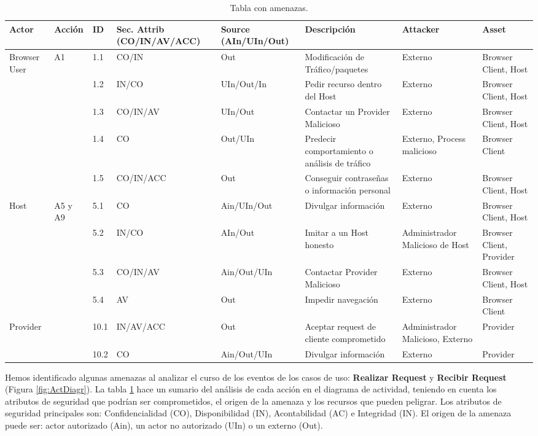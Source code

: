 \begin{landscape}%
\begin{table}[h!t]
\caption{Tabla con amenazas.}
\centering
\begin{tabular}{ |m{3.5em}|m{2.5em}|m{1.5em}|m{6em}|m{6em}|m{10em}|m{6em}|m{7em}|} 
\hline
Actor & Acción & ID & Sec. Attrib (CO/IN/AV/ACC) & Source (AIn/UIn/Out) & Descripción & Attacker & Asset\\
\hline
\multirow{5}{1em}{Browser User} & \multirow{5}{1em}{A1} & 1.1 & CO/IN & Out & Modificación de Tráfico/paquetes & Externo & Browser Client, Host\\ 
& & 1.2 & IN/CO & UIn/Out/In & Pedir recurso dentro del Host & Externo & Browser Client, Host\\
& & 1.3 & CO/IN/AV & UIn/Out & Contactar un Provider Malicioso & Externo & Browser Client, Host\\
& & 1.4 & CO & Out/UIn & Predecir comportamiento o análisis de tráfico & Externo, Process malicioso & Browser Client\\
& & 1.5 & CO/IN/ACC & Out & Conseguir contraseñas o información personal & Externo & Browser Client, Host\\
\hline
\multirow{4}{1em}{Host} & \multirow{5}{1em}{A5 y A9} & 5.1 & CO & Ain/UIn/Out & Divulgar información & Externo & Browser Client, Host\\ 
& & 5.2 & IN/CO & AIn/Out & Imitar a un Host honesto & Administrador Malicioso de Host & Browser Client, Provider\\
& & 5.3 & CO/IN/AV & Ain/Out/UIn & Contactar Provider Malicioso & Externo & Browser Client, Host\\
& & 5.4 & AV & Out & Impedir navegación & Externo & Browser Client\\
\hline
\multirow{2}{1em}{Provider} & \multirow{5}{1em}{A10} & 10.1 & IN/AV/ACC & Out & Aceptar request de cliente comprometido & Administrador Malicioso, Externo & Provider\\ 
& & 10.2 & CO & Ain/Out/UIn & Divulgar información & Externo & Provider\\

\hline
\end{tabular}
\label{tab:threats}
\end{table}
\end{landscape}

Hemos identificado algunas amenazas al analizar el curso de los eventos de los casos de uso: \textbf{Realizar Request} y \textbf{Recibir Request} (Figura \ref{fig:ActDiagr}). La tabla \ref{tab:threats} hace un sumario del análisis de cada acción en el diagrama de actividad, teniendo en cuenta los atributos de seguridad que podrían ser comprometidos, el origen de la amenaza y los recursos que pueden peligrar. Los atributos de seguridad principales son: Confidencialidad (CO), Disponibilidad (IN), Acontabilidad (AC) e Integridad (IN). El origen de la amenaza puede ser: actor autorizado (Ain), un actor no autorizado (UIn) o un externo (Out).

